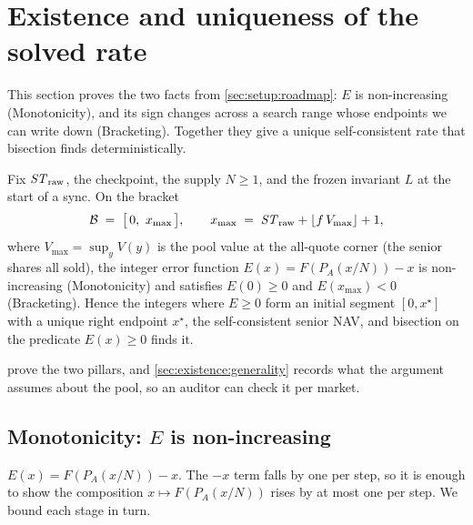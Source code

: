 \section{Existence and uniqueness of the solved rate}
\label{sec:existence}

This section proves the two facts from \cref{sec:setup:roadmap}: $E$ is
non-increasing (Monotonicity), and its sign changes across a search range
whose endpoints we can write down (Bracketing). Together they give a unique
self-consistent rate that bisection finds deterministically.

\begin{theorem}
\label{thm:main}
Fix $\mathit{ST}_{\mathrm{raw}}$, the checkpoint, the supply $N \geq 1$, and the frozen
invariant $L$ at the start of a sync. On the bracket
\[
  \mathcal{B} \;=\; \bigl[\,0,\ x_{\max}\,\bigr],
  \qquad
  x_{\max} \;=\; \mathit{ST}_{\mathrm{raw}} + \lfloor f\,V_{\max}\rfloor + 1,
\]
where $V_{\max} = \sup_y V(y)$ is the pool value at the all-quote corner
(the senior shares all sold), the integer error function
$E(x) = F(P_A(x/N)) - x$ is
non-increasing \textup{(Monotonicity)} and satisfies $E(0) \geq 0$ and
$E(x_{\max}) < 0$ \textup{(Bracketing)}. Hence the integers where $E \geq 0$
form an initial segment $[0, x^\star]$ with a unique right endpoint $x^\star$, the
self-consistent senior NAV, and bisection on the predicate
$E(x) \geq 0$ finds it.
\end{theorem}

 prove the two pillars, and
\cref{sec:existence:generality} records what the argument assumes about
the pool, so an auditor can check it per market.

\subsection{Monotonicity: $E$ is non-increasing}
\label{sec:existence:mono}

$E(x) = F(P_A(x/N)) - x$. The $-x$ term falls by one per step, so it is
enough to show the composition $x \mapsto F(P_A(x/N))$ rises by at most
one per step. We bound each stage in turn.


